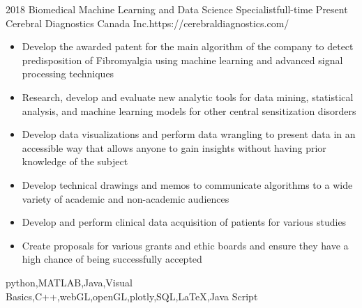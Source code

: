 %
%
%




\begin{experiences}
	
	\myExperience
	{2018}       {Biomedical Machine Learning and Data Science Specialist}{full-time}
	{Present}      {Cerebral Diagnostics Canada Inc.}{https://cerebraldiagnostics.com/}
	{
		\begin{itemize}
			\item  Develop the awarded patent for the main algorithm of the company to detect predisposition of Fibromyalgia using machine learning and advanced signal processing techniques
			\item Research, develop and evaluate new analytic tools for data mining, statistical analysis, and machine learning models for other central sensitization disorders
			\item Develop data visualizations and perform data wrangling to present data in an accessible way that allows anyone to gain insights without having prior knowledge of the subject
			\item Develop technical drawings and memos to communicate algorithms to a wide variety of academic and non-academic audiences
			\item Develop and perform clinical data acquisition of patients for various studies
			\item Create proposals for various grants and ethic boards and ensure they have a high chance of being successfully accepted
		\end{itemize}
	}
	{python,MATLAB,Java,Visual Basics,C++,webGL,openGL,plotly,SQL,\LaTeX,Java Script}
	
	\emptySeparator
	

\end{experiences}
